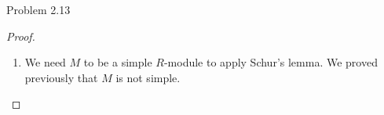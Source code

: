 \documentclass[a4paper]{article}
\begin{document}
\begin{ex}{Problem 2.13}{}
\begin{proof}
\begin{enumerate}
\begin{align*}
\begin{pmatrix}
x+y \\ z
\end{pmatrix}\right)\\
\begin{pmatrix}
px+qy\\qz
\end{pmatrix}&=\begin{pmatrix}
px+py \\ qz
\end{pmatrix}
\end{align*}
Thus it is clear that $p=q$ so that $\psi$ is a multiplication by a scalar. This proves surjectivity and we have an isomorphism $$\Q\cong\text{End}_RM$$ so that we conclude. 
\item We need $M$ to be a simple $R$-module to apply Schur's lemma. We proved previously that $M$ is not simple. 
\end{enumerate}
\end{proof}
\end{ex}
\end{document}
